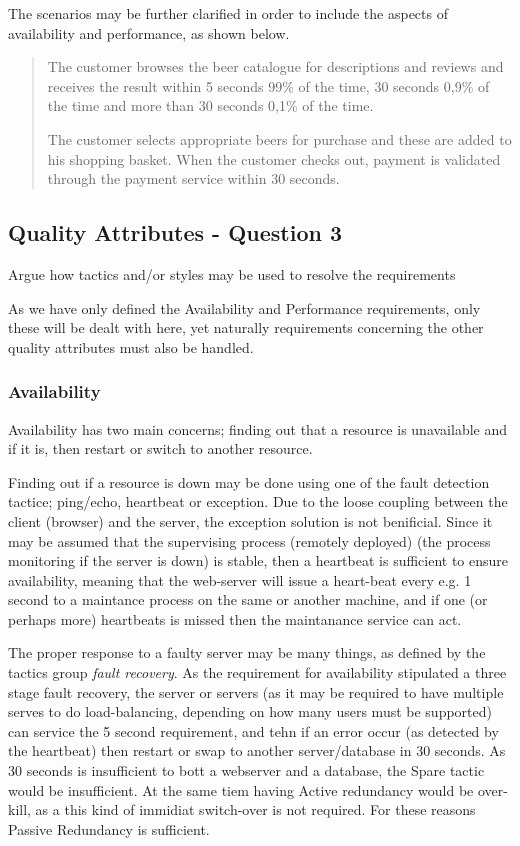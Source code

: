 The scenarios may be further clarified in order to include the aspects of availability and performance, as shown below. 

\begin{quote}
The customer browses the beer catalogue for descriptions and reviews and receives the result within 5 seconds 99\% of the time, 30 seconds 0,9\% of the time and more than 30 seconds 0,1\% of the time. 

The customer selects appropriate beers for purchase and these are added to his shopping basket. When the customer checks out, payment is validated through the payment service within 30 seconds.
\end{quote}


\subsection{Quality Attributes - Question 3}
\label{sec:qa_q3}

\begin{question}
Argue how tactics and/or styles may be used to resolve the requirements
\end{question}

As we have only defined the Availability and Performance requirements, only these will be dealt with here, yet naturally requirements concerning the other quality attributes must also be handled.

\subsubsection{Availability}
Availability has two main concerns; finding out that a resource is unavailable and if it is, then restart or switch to another resource. 

Finding out if a resource is down may be done using one of the fault detection tactice; ping/echo, heartbeat or exception. Due to the loose coupling between the client (browser) and the server, the exception solution is not benificial. Since it may be assumed that the supervising process (remotely deployed) (the process monitoring if the server is down) is stable, then a heartbeat is sufficient to ensure availability, meaning that the web-server will issue a heart-beat every e.g. 1 second to a maintance process on the same or another machine, and if one (or perhaps more) heartbeats is missed then the maintanance service can act.

The proper response to a faulty server may be many things, as defined by the tactics group \emph{fault recovery}. As the requirement for availability stipulated a three stage fault recovery, the server or servers (as it may be required to have multiple serves to do load-balancing, depending on how many users must be supported) can service the 5 second requirement, and tehn if an error occur (as detected by the heartbeat) then restart or swap to another server/database in 30 seconds. As 30 seconds is insufficient to bott a webserver and a database, the Spare tactic would be insufficient. At the same tiem having Active redundancy would be over-kill, as a this kind of immidiat switch-over is not required. For these reasons Passive Redundancy is sufficient.

